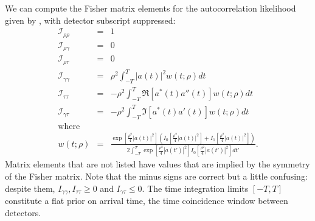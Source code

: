 \documentclass{iopart}
\begin{document}
We can compute the Fisher matrix elements for the autocorrelation likelihood given by , with detector subscript suppressed:
%
\begin{eqnarray}
	\nonumber
	\mathcal{I}_{\rho\rho} &=& 1 \\
	\nonumber
	\mathcal{I}_{\rho\gamma} &=& 0 \\
	\nonumber
	\mathcal{I}_{\rho\tau} &=& 0 \\
	\label{eq:fisher-autocor-gamma-gamma}
	\mathcal{I}_{\gamma\gamma} &=& \rho^2
		\int_{-T}^T \left|a(t)\right|^2 w(t; \rho) dt \\
	\label{eq:fisher-autocor-tau-tau}
	\mathcal{I}_{\tau\tau} &=& -\rho^2
		\int_{-T}^T \Re\left[a^*(t) a''(t)\right] w(t; \rho) dt \\
	\label{eq:fisher-autocor-gamma-tau}
	\mathcal{I}_{\gamma\tau} &=& -\rho^2
		\int_{-T}^T \Im\left[a^*(t) a'(t)\right] w(t; \rho) dt \\
	\nonumber\textrm{where} && \\
	w(t; \rho) &=& \frac{
		\displaystyle
		\exp\left[\frac{\rho^2}{4}\left|a(t)\right|^2\right]
		\left(
		I_0\left[\frac{\rho^2}{4}\left|a(t)\right|^2\right] +
		I_1\left[\frac{\rho^2}{4}\left|a(t)\right|^2\right]
		\right)
	}{
		\displaystyle
		2 \int_{-T}^T
		\exp\left[\frac{\rho^2}{4}\left|a(t')\right|^2\right]
		I_0\left[\frac{\rho^2}{4}\left|a(t')\right|^2\right]
		dt'
	}.
\end{eqnarray}
%
Matrix elements that are not listed have values that are implied by the symmetry of the Fisher matrix. Note that the minus signs are correct but a little confusing: despite them, ${I}_{\gamma\gamma}, {I}_{\tau\tau} \geq 0$ and ${I}_{\gamma\tau} \leq 0$. The time integration limits $[-T, T]$ constitute a flat prior on arrival time, the time coincidence window between detectors.
\end{document}
